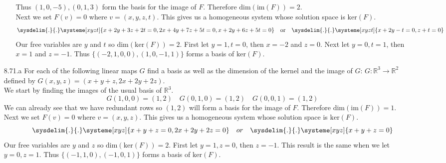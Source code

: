 \documentclass[12pt]{article}
\theoremstyle{definition}
\theoremstyle{plain}
\begin{document}
\begin{enumerate}
\begin{enumerate}
	Thus $(1,0,-5),(0,1,3)$ form the basis for the image of $F$. Therefore $\mathrm{dim}(\mathrm{im}(F))=2$.\\
	Next we set $F(v)=0$ where $v=(x,y,z,t)$. This gives us a homogeneous system whose solution space is $\mathrm{ker}(F)$.
	\[ \sysdelim{.}{.}\systeme[xyzt]{x+2y+3z+2t=0,2x+4y+7z+5t=0,x+2y+6z+5t=0} \quad \mathrm{or} \quad \sysdelim{.}{.}\systeme[xyzt]{x+2y-t=0,z+t=0} \]
	Our free variables are $y$ and $t$ so $\mathrm{dim}(\mathrm{ker}(F))=2$. First let $y=1,t=0$, then $x=-2$ and $z=0$. Next let $y=0,t=1$, then $x=1$ and $z=-1$. Thus $\{(-2,1,0,0),(1,0,-1,1)\}$ forms a basis of $\mathrm{ker}(F)$.
	\end{enumerate}

\item[8.71.a] For each of the following linear maps $G$ find a basis as well as the dimension of the kernel and the image of $G$: $G:\mathbb{R}^3\rightarrow\mathbb{R}^2$ defined by $G(x,y,z)=(x+y+z,2x+2y+2z)$.\\
	We start by finding the images of the usual basis of $\mathbb{R}^3$.
	\[ G(1,0,0)=(1,2) \quad G(0,1,0)=(1,2) \quad G(0,0,1)=(1,2) \]
	We can already see that we have redundant rows so $(1,2)$ will form a basis for the image of $F$. Therefore $\mathrm{dim}(\mathrm{im}(F))=1$.\\
	Next we set $F(v)=0$ where $v=(x,y,z)$. This gives us a homogeneous system whose solution space is $\mathrm{ker}(F)$.
	\[ \sysdelim{.}{.}\systeme[xyz]{x+y+z=0,2x+2y+2z=0} \quad or \quad \sysdelim{.}{.}\systeme[xyz]{x+y+z=0} \]
	Our free variables are $y$ and $z$ so $\mathrm{dim}(\mathrm{ker}(F))=2$. First let $y=1,z=0$, then $z=-1$. This result is the same when we let $y=0,z=1$. Thus $\{(-1,1,0),(-1,0,1)\}$ forms a basis of $\mathrm{ker}(F)$.


\end{enumerate}
\end{document}
